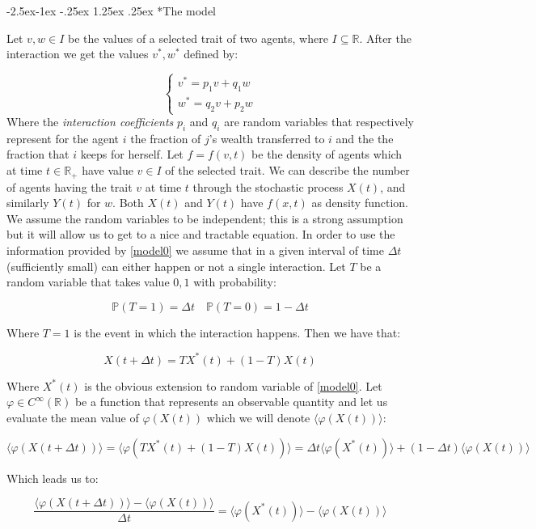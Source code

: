 \documentclass[12pt,a4paper]{article}
\makeatletter
\renewcommand\paragraph{\@startsection{paragraph}{0}{\z@}%
            {-2.5ex\@plus -1ex \@minus -.25ex}%
            {1.25ex \@plus .25ex}%
            {\normalfont\normalsize\bfseries}}
\numberwithin{theorem}{section}
\numberwithin{definition}{section}
\numberwithin{example}{section}
\numberwithin{exercise}{section}
\newcommand{\R}{\mathbb{R}}
\makeatother
\begin{document}
\paragraph*{The model}

Let $v,w\in I$ be the values of a selected trait of two agents, where $I\subseteq\R$. After the interaction we get the values $v^{*},w^{*}$ defined by:

\begin{equation}\label{model0}
\begin{cases}
v^{*}=p_1v+q_1w \\
w^{*}=q_2v+p_2w
\end{cases}
\end{equation}
Where the \textit{interaction coefficients} $p_i$ and $q_i$ are random variables that respectively represent for the agent $i$ the fraction of $j$'s wealth transferred to $i$ and the the fraction that $i$ keeps for herself. Let $f=f(v,t)$ be the density of agents which at time $t\in\R_+$ have value $v\in I$ of the selected trait. We can describe the number of agents having the trait $v$ at time $t$ through the stochastic process $X(t)$, and similarly $Y(t)$ for $w$. Both $X(t)$ and $Y(t)$ have $f(x,t)$ as density function. We assume the random variables to be independent; this is a strong assumption but it will allow us to get to a nice and tractable equation. In order to use the information provided by \ref{model0} we assume that in a given interval of time $\Delta t$ (sufficiently small) can either happen or not a single interaction. Let $T$ be a random variable that takes value $0,1$ with probability:

\[\mathbb{P}\left(T=1\right)=\Delta t \quad \mathbb{P}\left(T=0\right)=1-\Delta t\]

Where $T=1$ is the event in which the interaction happens. Then we have that:

\[X(t+\Delta t)=TX^{*}(t)+(1-T)X(t)\]

Where $X^{*}(t)$ is the obvious extension to random variable of \ref{model0}. Let $\varphi\in C^{\infty}(\R)$ be a function that represents an observable quantity and let us evaluate the mean value of $\varphi(X(t))$ which we will denote $\langle\varphi(X(t))\rangle$:

\[\langle\varphi(X(t+\Delta t))\rangle=\langle\varphi(TX^{*}(t)+(1-T)X(t))\rangle=\Delta t\langle\varphi(X^{*}(t))\rangle+(1-\Delta t)\langle\varphi(X(t))\rangle\]

Which leads us to:

\[\frac{\langle\varphi(X(t+\Delta t))\rangle-\langle\varphi(X(t))\rangle}{\Delta t}=\langle\varphi(X^{*}(t))\rangle-\langle\varphi(X(t))\rangle\]
\end{document}
